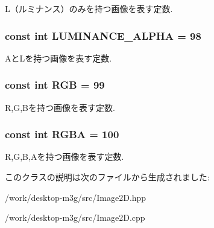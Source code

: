 L（ルミナンス）のみを持つ画像を表す定数. \hypertarget{classm3g_1_1Image2D_1a74b878039f244c27120cacb4eb6a3e}{
\subsubsection[{LUMINANCE\_\-ALPHA}]{\setlength{\rightskip}{0pt plus 5cm}const int {\bf LUMINANCE\_\-ALPHA} = 98}}
\label{classm3g_1_1Image2D_1a74b878039f244c27120cacb4eb6a3e}


AとLを持つ画像を表す定数. \hypertarget{classm3g_1_1Image2D_5f237f1b0f2ce6351e9e4a494b8dc759}{
\subsubsection[{RGB}]{\setlength{\rightskip}{0pt plus 5cm}const int {\bf RGB} = 99}}
\label{classm3g_1_1Image2D_5f237f1b0f2ce6351e9e4a494b8dc759}


R,G,Bを持つ画像を表す定数. \hypertarget{classm3g_1_1Image2D_0aaf9f2f4c064633c6d2888ec2c39e92}{
\subsubsection[{RGBA}]{\setlength{\rightskip}{0pt plus 5cm}const int {\bf RGBA} = 100}}
\label{classm3g_1_1Image2D_0aaf9f2f4c064633c6d2888ec2c39e92}


R,G,B,Aを持つ画像を表す定数. 

このクラスの説明は次のファイルから生成されました:\begin{CompactItemize}
\item 
/work/desktop-m3g/src/Image2D.hpp\item 
/work/desktop-m3g/src/Image2D.cpp\end{CompactItemize}
